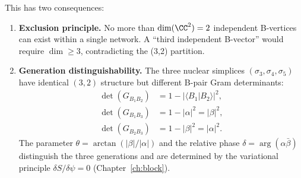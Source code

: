 This has two consequences:
\begin{enumerate}
\item \textbf{Exclusion principle.}  No more than $\dim(\CC^2) = 2$ independent B-vertices can exist within a single network.  A ``third independent B-vector'' would require $\dim \geq 3$, contradicting the (3,2) partition.

\item \textbf{Generation distinguishability.}  The three nuclear simplices $(\sigma_3, \sigma_4, \sigma_5)$ have identical $(3,2)$ structure but different B-pair Gram determinants:
\begin{align}
\det(G_{B_1 B_2}) &= 1 - |\langle B_1 | B_2 \rangle|^2, \\
\det(G_{B_1 B_3}) &= 1 - |\alpha|^2 = |\beta|^2, \\
\det(G_{B_2 B_3}) &= 1 - |\beta|^2 = |\alpha|^2.
\end{align}
The parameter $\theta = \arctan(|\beta|/|\alpha|)$ and the relative phase $\delta = \arg(\alpha\bar\beta)$ distinguish the three generations and are determined by the variational principle $\delta S / \delta\psi = 0$ (Chapter~\ref{ch:block}).
\end{enumerate}
